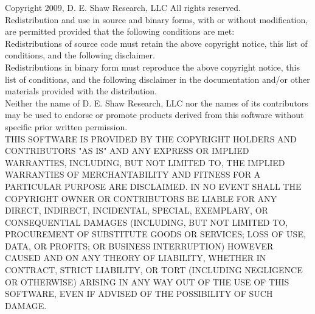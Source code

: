 \begin{itemize}
Copyright 2009, D. E. Shaw Research, LLC
All rights reserved.
\\
Redistribution and use in source and binary forms, with or without
modification, are permitted provided that the following conditions are
met:
\\
  Redistributions of source code must retain the above copyright
  notice, this list of conditions, and the following disclaimer.
\\
  Redistributions in binary form must reproduce the above copyright
  notice, this list of conditions, and the following disclaimer in the
  documentation and/or other materials provided with the distribution.
\\
  Neither the name of D. E. Shaw Research, LLC nor the names of its
  contributors may be used to endorse or promote products derived from
  this software without specific prior written permission.
\\
THIS SOFTWARE IS PROVIDED BY THE COPYRIGHT HOLDERS AND CONTRIBUTORS
"AS IS" AND ANY EXPRESS OR IMPLIED WARRANTIES, INCLUDING, BUT NOT
LIMITED TO, THE IMPLIED WARRANTIES OF MERCHANTABILITY AND FITNESS FOR
A PARTICULAR PURPOSE ARE DISCLAIMED. IN NO EVENT SHALL THE COPYRIGHT
OWNER OR CONTRIBUTORS BE LIABLE FOR ANY DIRECT, INDIRECT, INCIDENTAL,
SPECIAL, EXEMPLARY, OR CONSEQUENTIAL DAMAGES (INCLUDING, BUT NOT
LIMITED TO, PROCUREMENT OF SUBSTITUTE GOODS OR SERVICES; LOSS OF USE,
DATA, OR PROFITS; OR BUSINESS INTERRUPTION) HOWEVER CAUSED AND ON ANY
THEORY OF LIABILITY, WHETHER IN CONTRACT, STRICT LIABILITY, OR TORT
(INCLUDING NEGLIGENCE OR OTHERWISE) ARISING IN ANY WAY OUT OF THE USE
OF THIS SOFTWARE, EVEN IF ADVISED OF THE POSSIBILITY OF SUCH DAMAGE.


\end{itemize}

